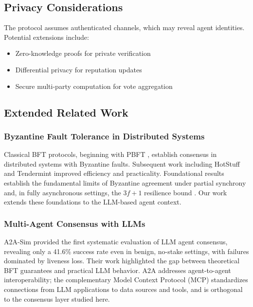 \documentclass{article}
\begin{document}
\subsection{Privacy Considerations}

The protocol assumes authenticated channels, which may reveal agent identities. Potential extensions include:
\begin{itemize}
    \item Zero-knowledge proofs for private verification
    \item Differential privacy for reputation updates
    \item Secure multi-party computation for vote aggregation
\end{itemize}



\subsection{Extended Related Work}\label{app:extrelated}

\subsubsection{Byzantine Fault Tolerance in Distributed Systems}

Classical BFT protocols, beginning with PBFT \citep{castro1999practical}, establish consensus in distributed systems with Byzantine faults. Subsequent work including HotStuff \citep{yin2019hotstuff} and Tendermint \citep{buchman2018latest} improved efficiency and practicality. Foundational results establish the fundamental limits of Byzantine agreement under partial synchrony \citep{dwork1988consensus} and, in fully asynchronous settings, the $3f{+}1$ resilience bound \citep{lamport1982byzantine}. Our work extends these foundations to the LLM-based agent context.

\subsubsection{Multi-Agent Consensus with LLMs}

A2A-Sim \citep{a2a_sim_2026} provided the first systematic evaluation of LLM agent consensus, revealing only a 41.6\% success rate even in benign, no-stake settings, with failures dominated by liveness loss. Their work highlighted the gap between theoretical BFT guarantees and practical LLM behavior. A2A addresses agent-to-agent interoperability; the complementary Model Context Protocol (MCP) \citep{mcp_2024} standardizes connections from LLM applications to data sources and tools, and is orthogonal to the consensus layer studied here.
\end{document}
